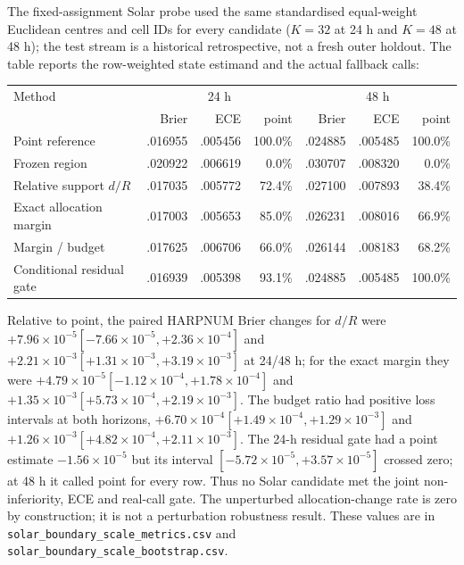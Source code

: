 \documentclass[11pt,a4paper]{article}
\numberwithin{equation}{section}
\theoremstyle{definition}\newtheorem{definition}[theorem]{Definition}
\theoremstyle{remark}\newtheorem{remark}[theorem]{Remark}
\begin{document}
The fixed-assignment Solar probe used the same standardised equal-weight Euclidean centres and cell IDs for every candidate ($K=32$ at 24 h and $K=48$ at 48 h); the test stream is a historical retrospective, not a fresh outer holdout. The table reports the row-weighted state estimand and the actual fallback calls:
\begin{center}
\small
\begin{tabularx}{\linewidth}{lrrrrrr}
\toprule
Method & \multicolumn{3}{c}{24 h} & \multicolumn{3}{c}{48 h}\\
 & Brier & ECE & point & Brier & ECE & point\\
\midrule
Point reference & .016955 & .005456 & 100.0\% & .024885 & .005485 & 100.0\%\\
Frozen region & .020922 & .006619 & 0.0\% & .030707 & .008320 & 0.0\%\\
Relative support $d/R$ & .017035 & .005772 & 72.4\% & .027100 & .007893 & 38.4\%\\
Exact allocation margin & .017003 & .005653 & 85.0\% & .026231 & .008016 & 66.9\%\\
Margin / budget & .017625 & .006706 & 66.0\% & .026144 & .008183 & 68.2\%\\
Conditional residual gate & .016939 & .005398 & 93.1\% & .024885 & .005485 & 100.0\%\\
\bottomrule
\end{tabularx}
\end{center}
Relative to point, the paired HARPNUM Brier changes for $d/R$ were $+7.96\times10^{-5}[-7.66\times10^{-5},+2.36\times10^{-4}]$ and $+2.21\times10^{-3}[+1.31\times10^{-3},+3.19\times10^{-3}]$ at 24/48 h; for the exact margin they were $+4.79\times10^{-5}[-1.12\times10^{-4},+1.78\times10^{-4}]$ and $+1.35\times10^{-3}[+5.73\times10^{-4},+2.19\times10^{-3}]$. The budget ratio had positive loss intervals at both horizons, $+6.70\times10^{-4}[+1.49\times10^{-4},+1.29\times10^{-3}]$ and $+1.26\times10^{-3}[+4.82\times10^{-4},+2.11\times10^{-3}]$. The 24-h residual gate had a point estimate $-1.56\times10^{-5}$ but its interval $[-5.72\times10^{-5},+3.57\times10^{-5}]$ crossed zero; at 48 h it called point for every row. Thus no Solar candidate met the joint non-inferiority, ECE and real-call gate. The unperturbed allocation-change rate is zero by construction; it is not a perturbation robustness result. These values are in \texttt{solar\_boundary\_scale\_metrics.csv} and \texttt{solar\_boundary\_scale\_bootstrap.csv}.
\end{document}
